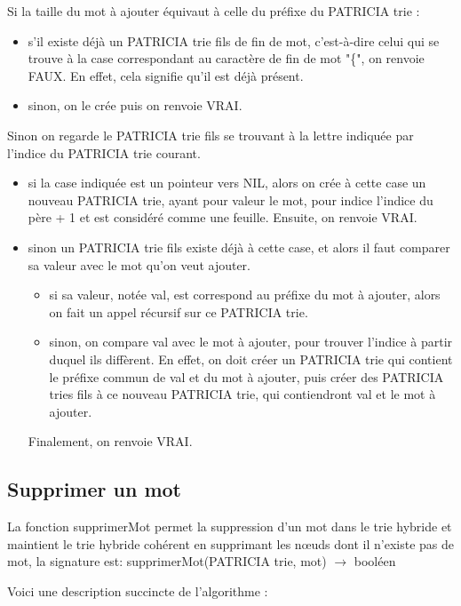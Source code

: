 \documentclass[a4paper,12pt]{report}
\begin{document}
Si la taille du mot à ajouter équivaut à celle du préfixe du PATRICIA trie :
\begin{itemize}
	\item s'il existe déjà un PATRICIA trie fils de fin de mot, c'est-à-dire celui qui se trouve à la case correspondant au caractère de fin de mot "\{", on renvoie FAUX. En effet, cela signifie qu'il est déjà présent. 
	\item sinon, on le crée puis on renvoie VRAI.
\end{itemize}
\smallbreak
Sinon on regarde le PATRICIA trie fils se trouvant à la lettre indiquée par l'indice du PATRICIA trie courant.
\begin{itemize}
	\item si la case indiquée est un pointeur vers NIL, alors on crée à cette case un nouveau PATRICIA trie, ayant pour valeur le mot, pour indice l'indice du père + 1 et est considéré comme une feuille. Ensuite, on renvoie VRAI.
	\item sinon un PATRICIA trie fils existe déjà à cette case, et alors il faut comparer sa valeur avec le mot qu'on veut ajouter.
	\begin{itemize}
			\item si sa valeur, notée val, est correspond au préfixe du mot à ajouter, alors on fait un appel récursif sur ce PATRICIA trie.
			\item sinon, on compare val avec le mot à ajouter, pour trouver l'indice à partir duquel ils diffèrent. En effet, on doit créer un PATRICIA trie qui contient le préfixe commun de val et du mot à ajouter, puis créer des PATRICIA tries fils à ce nouveau PATRICIA trie, qui contiendront val et le mot à ajouter.
	\end{itemize}
	Finalement, on renvoie VRAI.
\end{itemize}


\subsection{Supprimer un mot}
La fonction supprimerMot permet la suppression d'un mot dans le trie hybride et maintient le trie hybride cohérent en supprimant
les nœuds dont il n'existe pas de mot, la signature est: supprimerMot(PATRICIA trie, mot) $\rightarrow$ booléen

Voici une description succincte de l'algorithme :
\end{document}
